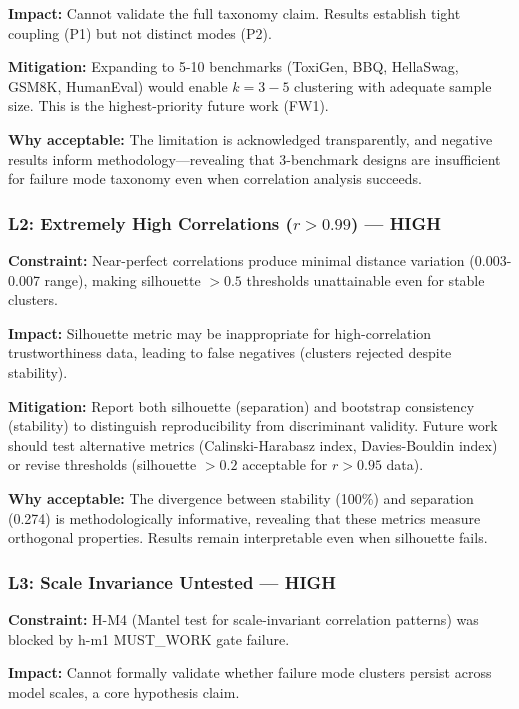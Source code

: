 \textbf{Impact:} Cannot validate the full taxonomy claim. Results establish tight coupling (P1) but not distinct modes (P2).

\textbf{Mitigation:} Expanding to 5-10 benchmarks (ToxiGen, BBQ, HellaSwag, GSM8K, HumanEval) would enable $k=3-5$ clustering with adequate sample size. This is the highest-priority future work (FW1).

\textbf{Why acceptable:} The limitation is acknowledged transparently, and negative results inform methodology---revealing that 3-benchmark designs are insufficient for failure mode taxonomy even when correlation analysis succeeds.

\subsubsection{L2: Extremely High Correlations ($r > 0.99$) --- HIGH}

\textbf{Constraint:} Near-perfect correlations produce minimal distance variation (0.003-0.007 range), making silhouette $> 0.5$ thresholds unattainable even for stable clusters.

\textbf{Impact:} Silhouette metric may be inappropriate for high-correlation trustworthiness data, leading to false negatives (clusters rejected despite stability).

\textbf{Mitigation:} Report both silhouette (separation) and bootstrap consistency (stability) to distinguish reproducibility from discriminant validity. Future work should test alternative metrics (Calinski-Harabasz index, Davies-Bouldin index) or revise thresholds (silhouette $> 0.2$ acceptable for $r > 0.95$ data).

\textbf{Why acceptable:} The divergence between stability (100\%) and separation (0.274) is methodologically informative, revealing that these metrics measure orthogonal properties. Results remain interpretable even when silhouette fails.

\subsubsection{L3: Scale Invariance Untested --- HIGH}

\textbf{Constraint:} H-M4 (Mantel test for scale-invariant correlation patterns) was blocked by h-m1 MUST\_WORK gate failure.

\textbf{Impact:} Cannot formally validate whether failure mode clusters persist across model scales, a core hypothesis claim.


